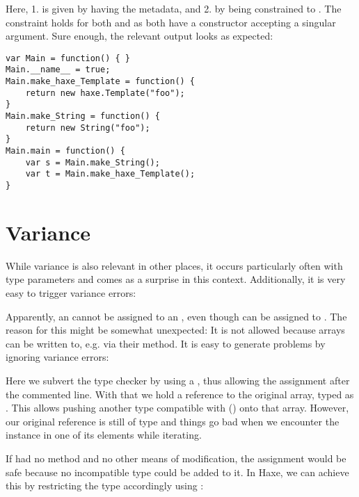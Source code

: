 Here, 1. is given by  having the  metadata, and 2. by  being constrained to . The constraint holds for both  and  as both have a constructor accepting a singular  argument. Sure enough, the relevant  output looks as expected:

\begin{lstlisting}
var Main = function() { }
Main.__name__ = true;
Main.make_haxe_Template = function() {
	return new haxe.Template("foo");
}
Main.make_String = function() {
	return new String("foo");
}
Main.main = function() {
	var s = Main.make_String();
	var t = Main.make_haxe_Template();
}
\end{lstlisting}

\section{Variance}
\label{type-system-variance}

While variance is also relevant in other places, it occurs particularly often with type parameters and comes as a surprise in this context. Additionally, it is very easy to trigger variance errors:


Apparently, an  cannot be assigned to an , even though  can be assigned to . The reason for this might be somewhat unexpected: It is not allowed because arrays can be written to, e.g. via their  method. It is easy to generate problems by ignoring variance errors:


Here we subvert the type checker by using a , thus allowing the assignment after the commented line. With that we hold a reference  to the original array, typed as . This allows pushing another type compatible with  () onto that array. However, our original reference  is still of type  and things go bad when we encounter the  instance in one of its elements while iterating.

If  had no  method and no other means of modification, the assignment would be safe because no incompatible type could be added to it. In Haxe, we can achieve this by restricting the type accordingly using :

